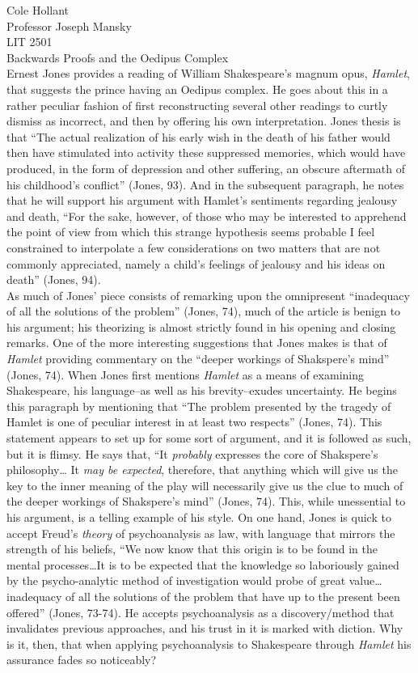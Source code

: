 \documentclass[12pt]{article}
\begin{document}
\noindent
{\large Cole Hollant}\\
{\large Professor Joseph Mansky}\\
{\large LIT 2501}\\
{\LARGE Backwards Proofs and the Oedipus Complex}\\
\indent Ernest Jones provides a reading of William Shakespeare's magnum opus, \textit{Hamlet}, that suggests the prince having an Oedipus complex. He goes about this in a rather peculiar fashion of first reconstructing several other readings to curtly dismiss as incorrect, and then by offering his own interpretation. Jones thesis is that ``The actual realization of his early wish in the death of his father would then have stimulated into activity these suppressed memories, which would have produced, in the form of depression and other suffering, an obscure aftermath of his childhood's conflict'' (Jones, 93). And in the subsequent paragraph, he notes that he will support his argument with Hamlet's sentiments regarding jealousy and death, ``For the sake, however, of those who may be interested to apprehend the point of view from which this strange hypothesis seems probable I feel constrained to interpolate a few considerations on two matters that are not commonly appreciated, namely a child's feelings of jealousy and his ideas on death'' (Jones, 94).\\
\indent As much of Jones' piece consists of remarking upon the omnipresent ``inadequacy of all the solutions of the problem'' (Jones, 74), much of the article is benign to his argument; his theorizing is almost strictly found in his opening and closing remarks. One of the more interesting suggestions that Jones makes is that of \textit{Hamlet} providing commentary on the ``deeper workings of Shakspere's mind'' (Jones, 74). When Jones first mentions \textit{Hamlet} as a means of examining Shakespeare, his language--as well as his brevity--exudes uncertainty. He begins this paragraph by mentioning that ``The problem presented by the tragedy of Hamlet is one of peculiar interest in at least two respects'' (Jones, 74). This statement appears to set up for some sort of argument, and it is followed as such, but it is flimsy. He says that, ``It \textit{probably} expresses the core of Shakspere's philosophy… It \textit{may be expected}, therefore, that anything which will give us the key to the inner meaning of the play will necessarily give us the clue to much of the deeper workings of Shakspere's mind'' (Jones, 74). This, while unessential to his argument, is a telling example of his style. On one hand, Jones is quick to accept Freud's \textit{theory} of psychoanalysis as law, with language that mirrors the strength of his beliefs, ``We now know that this origin is to be found in the mental processes…It is to be expected that the knowledge so laboriously gained by the psycho-analytic method of investigation would probe of great value… inadequacy of all the solutions of the problem that have up to the present been offered'' (Jones, 73-74). He accepts psychoanalysis as a discovery/method that invalidates previous approaches, and his trust in it is marked with diction. Why is it, then, that when applying psychoanalysis to Shakespeare through \textit{Hamlet} his assurance fades so noticeably?\\
\end{document}
